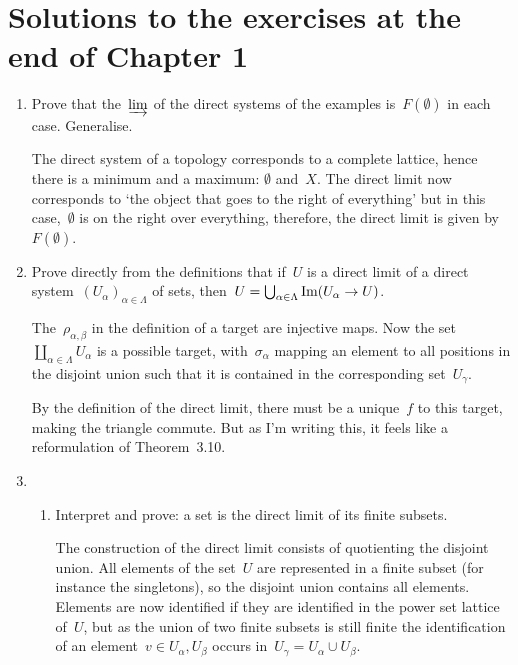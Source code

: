 \documentclass[a4paper,11pt,oneside,openany,article]{memoir}
\begin{document}
\title{}
\author{
  Pieter Belmans
}
\maketitle

\tableofcontents*

\chapter{Solutions to the exercises at the end of Chapter 1}
\begin{enumerate}
  \item Prove that the~$\varinjlim$ of the direct systems of the examples is~$F(\emptyset)$ in each case. Generalise.

    \begin{solution}
      The direct system of a topology corresponds to a complete lattice, hence there is a minimum and a maximum: $\emptyset$ and~$X$. The direct limit now corresponds to `the object that goes to the right of everything' but in this case,~$\emptyset$ is on the right over everything, therefore, the direct limit is given by~$F(\emptyset)$.
    \end{solution}

  \item Prove directly from the definitions that if~$U$ is a direct limit of a direct system~$(U_\alpha)_{\alpha\in\Lambda}$ of sets, then~$U=\bigcup_{\alpha\in\Lambda}\operatorname{Im}(U_\alpha\rightarrow U)$.

    \begin{solution}
      The~$\rho_{\alpha,\beta}$ in the definition of a target are injective maps. Now the set~$\coprod_{\alpha\in\Lambda}U_\alpha$ is a possible target, with~$\sigma_\alpha$ mapping an element to all positions in the disjoint union such that it is contained in the corresponding set~$U_\gamma$.

      By the definition of the direct limit, there must be a unique~$f$ to this target, making the triangle commute. But as I'm writing this, it feels like a reformulation of Theorem~3.10.
    \end{solution}

  \item
    \begin{enumerate}
      \item Interpret and prove: a set is the direct limit of its finite subsets.
      
        \begin{solution}
          The construction of the direct limit consists of quotienting the disjoint union. All elements of the set~$U$ are represented in a finite subset (for instance the singletons), so the disjoint union contains all elements. Elements are now identified if they are identified in the power set lattice of~$U$, but as the union of two finite subsets is still finite the identification of an element~$v\in U_\alpha,U_\beta$ occurs in~$U_\gamma=U_\alpha\cup U_\beta$.
        \end{solution}


\end{enumerate}
\end{enumerate}
\end{document}
